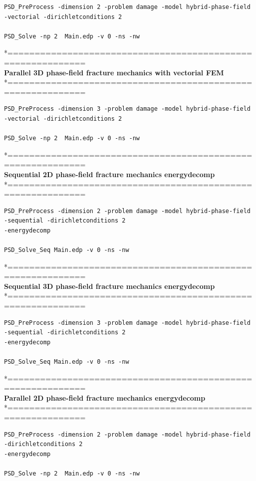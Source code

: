 \begin{lstlisting}[style=Linux]
PSD_PreProcess -dimension 2 -problem damage -model hybrid-phase-field -vectorial -dirichletconditions 2   

PSD_Solve -np 2  Main.edp -v 0 -ns -nw   
\end{lstlisting}
*============================================================\\
\textbf{ Parallel 3D phase-field fracture mechanics  with vectorial FEM} \\
*============================================================\\
\begin{lstlisting}[style=Linux]
PSD_PreProcess -dimension 3 -problem damage -model hybrid-phase-field -vectorial -dirichletconditions 2   

PSD_Solve -np 2  Main.edp -v 0 -ns -nw   
\end{lstlisting}
*============================================================\\
\textbf{ Sequential 2D  phase-field fracture mechanics energydecomp }\\
*============================================================\\
\begin{lstlisting}[style=Linux]
PSD_PreProcess -dimension 2 -problem damage -model hybrid-phase-field -sequential -dirichletconditions 2 
-energydecomp   

PSD_Solve_Seq Main.edp -v 0 -ns -nw   
\end{lstlisting}
*============================================================\\
\textbf{ Sequential 3D phase-field fracture mechanics energydecomp }\\
*============================================================\\
\begin{lstlisting}[style=Linux]
PSD_PreProcess -dimension 3 -problem damage -model hybrid-phase-field -sequential -dirichletconditions 2 
-energydecomp   

PSD_Solve_Seq Main.edp -v 0 -ns -nw   
\end{lstlisting}
*============================================================\\
\textbf{ Parallel 2D phase-field fracture mechanics energydecomp }\\
*============================================================\\
\begin{lstlisting}[style=Linux]
PSD_PreProcess -dimension 2 -problem damage -model hybrid-phase-field -dirichletconditions 2 
-energydecomp   

PSD_Solve -np 2  Main.edp -v 0 -ns -nw   
\end{lstlisting}
